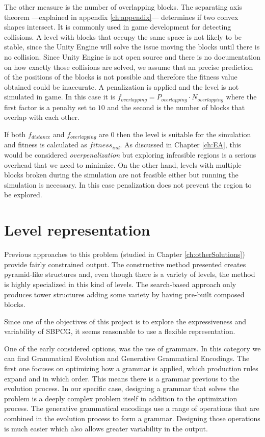 The other measure is the number of overlapping blocks. The separating axis theorem ---explained in appendix \ref{ch:appendix}--- determines if two convex shapes intersect. It is commonly used in game development for detecting collisions. A level with blocks that occupy the same space is not likely to be stable, since the Unity Engine will solve the issue moving the blocks until there is no collision. Since Unity Engine is not open source and there is no documentation on how exactly those collisions are solved, we assume that an precise prediction of the positions of the blocks is not possible and therefore the fitness value obtained could be inaccurate. A penalization is applied and the level is not simulated in game. In this case it is $f_{overlapping} = P_{overlapping} \cdot N_{overlapping}$ where the first factor is a penalty set to $10$ and the second is the number of  blocks that overlap with each other. 

If both $f_{distance}$ and $f_{overlapping}$ are $0$ then the level is suitable for the simulation and fitness is calculated as $fitness_{ind}$. As discussed in Chapter \ref{ch:EA}, this would be considered \textit{overpenalization} but exploring infeasible regions is a serious overhead that we need to minimize. On the other hand, levels with multiple blocks broken during the simulation are not feasible either but running the simulation is necessary. In this case penalization does not prevent the region to be explored.
\section{Level representation}

Previous approaches to this problem (studied in Chapter \ref{ch:otherSolutions}) provide fairly constrained output. The constructive method presented creates pyramid-like structures and, even though there is a variety of levels, the method is highly specialized in this kind of levels. The search-based approach only produces tower structures adding some variety by having pre-built composed blocks. 

Since one of the objectives of this project is to explore the expressiveness and variability of \acs{SBPCG}, it seems reasonable to use a flexible representation. 

One of the early considered options, was the use of grammars. In this category we can find Grammatical Evolution\cite{lourencco2015sge} and Generative Grammatical Encodings\cite{hornby2001advantages}. The first one focuses on optimizing how a grammar is applied, which production rules expand and in which order. This means there is a grammar previous to the evolution process. In our specific case, designing a grammar that solves the problem is a deeply complex problem itself in addition to the optimization process. The generative grammatical encodings use a range of operations that are combined in the evolution process to form a grammar. Designing those operations is much easier which also allows greater variability in the output. 

